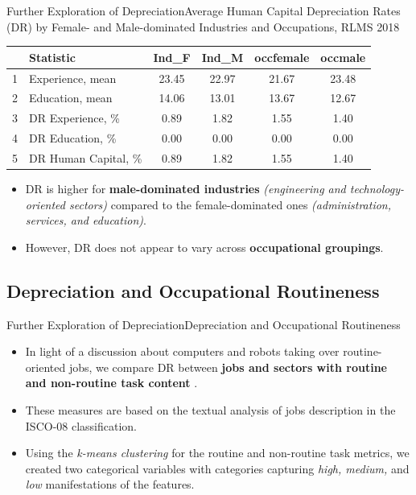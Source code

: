 \documentclass{beamer}
\begin{document}
\begin{frame}{Further Exploration of Depreciation}{Average Human Capital Depreciation Rates (DR) by Female- and Male-dominated Industries and Occupations, RLMS 2018}
	\begin{table}
		\centering 
		\label{tab:3.3} 
		\begin{tabular}{clcccc}
			\hline
			& \textbf{Statistic} &\textbf{Ind\_F}& \textbf{Ind\_M} & \textbf{occfemale} & \textbf{occmale} \\ 
			\hline
			1 & Experience, mean  & 23.45 & 22.97 & 21.67 & 23.48 \\ 
			2 & Education, mean & 14.06 & 13.01 & 13.67 & 12.67 \\ 
			\hline
			3 & DR Experience, \% & 0.89 & 1.82 & 1.55 & 1.40 \\ 
			4 & DR Education, \% & 0.00 & 0.00 & 0.00 & 0.00 \\ 
			5 & DR Human Capital, \% & 0.89 & 1.82 & 1.55 & 1.40 \\ 
			\hline
		\end{tabular}
	\end{table} 
	\begin{itemize}
		\item DR is higher for \textbf{male-dominated industries} \textit{(engineering and technology-oriented sectors)} compared to the female-dominated ones \textit{(administration, services, and education)}.
		\item However, DR does not appear to vary across \textbf{occupational groupings}.
	\end{itemize}
\end{frame}

\subsection{Depreciation and Occupational Routineness}

\begin{frame}{Further Exploration of Depreciation}{Depreciation and Occupational Routineness}
	\begin{itemize}
		\item In light of a discussion about computers and robots taking over routine-oriented jobs, we compare DR between  \textbf{jobs and sectors with routine and non-routine task content} \citep{mihaylov_152._2019}.
		\item These measures are based on the textual analysis of jobs description in the ISCO-08 classification.
		\item Using	the \textit{k-means clustering} for the routine and non-routine task metrics, we created two categorical variables with categories capturing \textit{high, medium,} and \textit{low} manifestations of the features.
	\end{itemize}
\end{frame}
\end{document}
